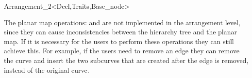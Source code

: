 \begin{ccRefClass}{Arrangement_2<Dcel,Traits,Base_node>}
    
    The planar map operations:  and  are
    not implemented in the arrangement level,
    since they can cause inconsistencies
    between the hierarchy tree and the planar map.
    If it is necessary for the users to perform these operations
    they can still achieve this. For example, if the users need to remove an
    edge they can remove the curve and insert the two subcurves that are
    created after the edge is removed,
    instead of the original curve.

\end{ccRefClass}


\ccRefPageEnd
